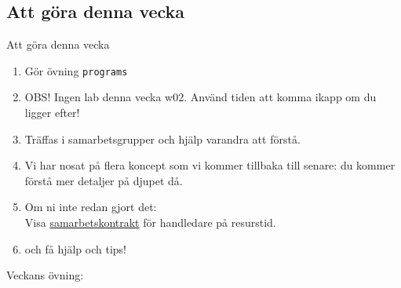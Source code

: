 \ifkompendium\else

\subsection{Att göra denna vecka}
\begin{SlideExtra}{Att göra denna vecka}

\begin{enumerate}
\item Gör övning \texttt{programs}
\item OBS! Ingen lab denna vecka w02. Använd tiden att komma ikapp om du ligger efter!
\item Träffas i samarbetsgrupper och hjälp varandra att förstå.
\item Vi har nosat på flera koncept som vi kommer tillbaka till senare: du kommer förstå mer detaljer på djupet då.
\item Om ni inte redan gjort det: \\Visa \href{https://github.com/bjornregnell/lth-eda016-2015/tree/master/assignments}{samarbetskontrakt} för handledare på resurstid.
\item {} och få hjälp och tips!
\end{enumerate}
\end{SlideExtra}

\begin{SlideExtra}{Veckans övning: \texttt{\ExeWeekTWO}}\SlideFontTiny
\vspace{-0.5em}
\setlength{\leftmargini}{0pt}
\begin{itemize}

\end{itemize}
\end{SlideExtra}

